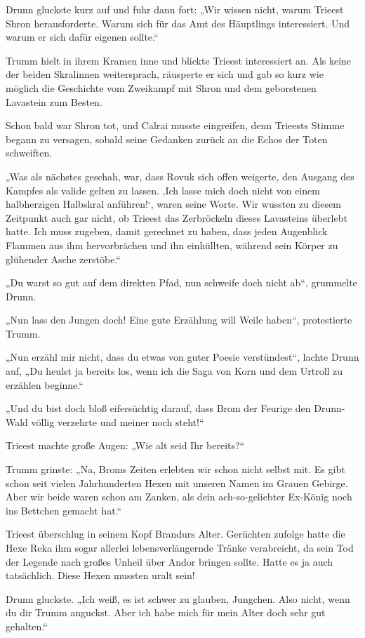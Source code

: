 Drunn gluckste kurz auf und fuhr dann fort: „Wir wissen nicht, warum Trieest Shron herausforderte. Warum sich für das Amt des Häuptlings interessiert. Und warum er sich dafür eigenen sollte.“

Trumm hielt in ihrem Kramen inne und blickte Trieest interessiert an. Als keine der beiden Skralinnen weitersprach, räusperte er sich und gab so kurz wie möglich die Geschichte vom Zweikampf mit Shron und dem geborstenen Lavastein zum Besten.

Schon bald war Shron tot, und Calrai musste eingreifen, denn Trieests Stimme begann zu versagen, sobald seine Gedanken zurück an die Echos der Toten schweiften.

„Was als nächstes geschah, war, dass Rovuk sich offen weigerte, den Ausgang des Kampfes als valide gelten zu lassen. ‚Ich lasse mich doch nicht von einem halbherzigen Halbskral anführen!‘, waren seine Worte. Wir wussten zu diesem Zeitpunkt auch gar nicht, ob Trieest das Zerbröckeln dieses Lavasteins überlebt hatte. Ich muss zugeben, damit gerechnet zu haben, dass jeden Augenblick Flammen aus ihm hervorbrächen und ihn einhüllten, während sein Körper zu glühender Asche zerstöbe.“

„Du warst so gut auf dem direkten Pfad, nun schweife doch nicht ab“, grummelte Drunn.

„Nun lass den Jungen doch! Eine gute Erzählung will Weile haben“, protestierte Trumm.

„Nun erzähl mir nicht, dass du etwas von guter Poesie verstündest“, lachte Drunn auf, „Du heulst ja bereits los, wenn ich die Saga von Korn und dem Urtroll zu erzählen beginne.“

„Und du bist doch bloß eifersüchtig darauf, dass Brom der Feurige den Drunn-Wald völlig verzehrte und meiner noch steht!“

Trieest machte große Augen: „Wie alt seid Ihr bereits?“

Trumm grinste: „Na, Broms Zeiten erlebten wir schon nicht selbst mit. Es gibt schon seit vielen Jahrhunderten Hexen mit unseren Namen im Grauen Gebirge. Aber wir beide waren schon am Zanken, als dein ach-so-geliebter Ex-König noch ins Bettchen gemacht hat.“

Trieest überschlug in seinem Kopf Brandurs Alter. Gerüchten zufolge hatte die Hexe Reka ihm sogar allerlei lebensverlängernde Tränke verabreicht, da sein Tod der Legende nach großes Unheil über Andor bringen sollte. Hatte es ja auch tatsächlich. Diese Hexen mussten uralt sein!

Drunn gluckste. „Ich weiß, es ist schwer zu glauben, Jungchen. Also nicht, wenn du dir Trumm anguckst. Aber ich habe mich für mein Alter doch sehr gut gehalten.“

